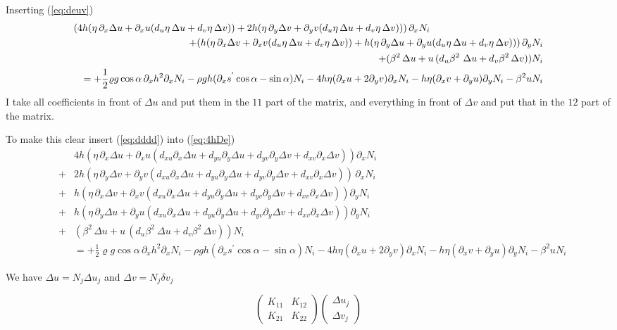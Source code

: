 \documentclass[10pt,a4paper]{book}
\newcommand{\p}{\partial}
\begin{document}
Inserting (\ref{eq:deuv})
\begin{eqnarray*}
\lefteqn{
( 4 h  (\eta \, \p_x \Delta u +\p_x u (d_u\eta \,\Delta u + d_v\eta \, \Delta v)) 
+ 2 h  (\eta \, \p_y \Delta v +\p_y v (d_u\eta \,\Delta u + d_v\eta \,\Delta v)))\, \p_x N_i} \\
& & +   (h( \eta \, \p_x \Delta v + \p_x v( d_u\eta \, \Delta u + d_v\eta\,\Delta v))  
    + h ( \eta \, \p_y \Delta u + \p_y u (d_u\eta\,\Delta u + d_v \eta\,\Delta v))) \, \p_y N_i\\
& &  +( \beta^2 \, \Delta u + u\, (d_u \beta^2\ \Delta u + d_v \beta^2\,\Delta v)) N_i \\
& & = +\frac{1}{2} \varrho g  \cos \alpha \, \p_x h^2 \p_x N_i- \rho g h (\p_x s^{'} \cos \alpha  -  \sin \alpha ) N_i
- 4 h \eta (\p_x u+ 2 \p_y v) \p_x N_i - h \eta (\p_x v + \p_y u) \p_y N_i- \beta^2 u N_i
\end{eqnarray*}
I take all coefficients in front of $\Delta u$ and put them in the
$11$ part of the matrix, and everything in front of $\Delta v$ and put
that in the $12$ part of the matrix.

To make this clear insert (\ref{eq:dddd}) into (\ref{eq:4hDe})
\begin{eqnarray*}
& & 4 h  (\eta \, \p_x \Delta u +\p_x u (d_{xu} \p_x \Delta u + d_{yu} \p_y \Delta u + d_{yv} \p_y \Delta v + d_{xv} \p_x \Delta v)) \p_x N_i \\
&+&  2 h  (\eta \, \p_y \Delta v +\p_y v (d_{xu} \p_x \Delta u + d_{yu} \p_y \Delta u + d_{yv} \p_y \Delta v + d_{xv} \p_x \Delta v)) \, \p_x N_i \\
&+&    h( \eta \, \p_x \Delta v + \p_x v (d_{xu} \p_x \Delta u + d_{yu} \p_y \Delta u + d_{yv} \p_y \Delta v + d_{xv} \p_x \Delta v))\p_y N_i\\
&+&    h ( \eta \, \p_y \Delta u + \p_y u (d_{xu} \p_x \Delta u + d_{yu} \p_y \Delta u + d_{yv} \p_y \Delta v + d_{xv} \p_x \Delta v))\p_y N_i \\
&+&  ( \beta^2 \, \Delta u + u\, (d_u \beta^2\ \Delta u + d_v \beta^2\,\Delta v)) N_i \\
& & = +\frac{1}{2} \varrho g  \cos \alpha \, \p_x h^2 \p_x N_i- \rho g h (\p_x s^{'} \cos \alpha  -  \sin \alpha ) N_i
- 4 h \eta (\p_x u+ 2 \p_y v) \p_x N_i - h \eta (\p_x v + \p_y u) \p_y N_i- \beta^2 u N_i
\end{eqnarray*}

We have $\Delta u=N_j \Delta u_j$ and $\Delta v=N_j \delta v_j$


\[
\left ( \begin{array}{cc} K_{11} & K_{12} \\ K_{21} & K_{22} \end{array} \right )
\left ( \begin{array}{c} \Delta u_j \\ \Delta v_j \end{array} \right )
\]
\end{document}
